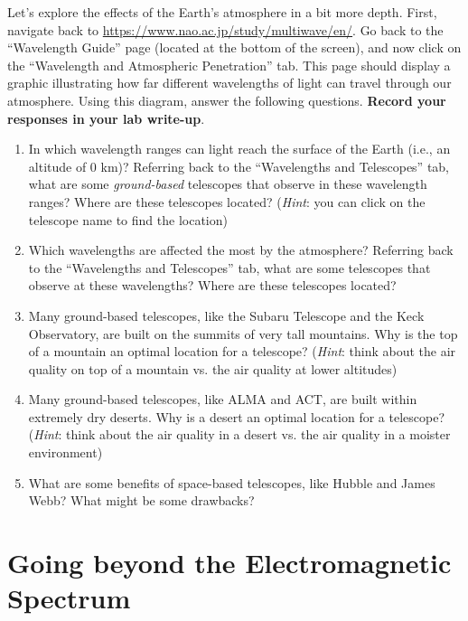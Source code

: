 \documentclass[11pt]{article}
\begin{document}
\medskip \noindent
Let's explore the effects of the Earth's atmosphere in a bit more depth. First, navigate back to \url{https://www.nao.ac.jp/study/multiwave/en/}. Go back to the ``Wavelength Guide'' page (located at the bottom of the screen), and now click on the ``Wavelength and Atmospheric Penetration'' tab. This page should display a graphic illustrating how far different wavelengths of light can travel through our atmosphere. Using this diagram, answer the following questions. \textbf{Record your responses in your lab write-up}.
\begin{enumerate}
    \item In which wavelength ranges can light reach the surface of the Earth (i.e., an altitude of 0 km)? Referring back to the ``Wavelengths and Telescopes'' tab, what are some \emph{ground-based} telescopes that observe in these wavelength ranges? Where are these telescopes located? (\textit{Hint}: you can click on the telescope name to find the location)
    
    \item Which wavelengths are affected the most by the atmosphere? Referring back to the ``Wavelengths and Telescopes'' tab, what are some telescopes that observe at these wavelengths? Where are these telescopes located?
    
    \item Many ground-based telescopes, like the Subaru Telescope and the Keck Observatory, are built on the summits of very tall mountains. Why is the top of a mountain an optimal location for a telescope? (\textit{Hint}: think about the air quality on top of a mountain vs. the air quality at lower altitudes)
    
    \item Many ground-based telescopes, like ALMA and ACT, are built within extremely dry deserts. Why is a desert an optimal location for a telescope? (\textit{Hint}: think about the air quality in a desert vs. the air quality in a moister environment)
    
    \item What are some benefits of space-based telescopes, like Hubble and James Webb? What might be some drawbacks?
\end{enumerate}

\section{Going beyond the Electromagnetic Spectrum}
\end{document}
